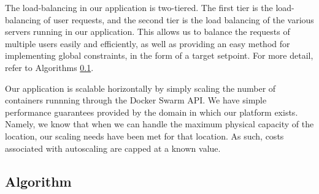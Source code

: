 \documentclass[10pt,twocolumn,letterpaper]{article}
\begin{document}
The load-balancing in our application is two-tiered. The first tier is the
load-balancing of user requests, and the second tier is the load balancing of
the various servers running in our application. This allows us to balance the
requests of multiple users easily and efficiently, as well as providing an easy
method for implementing global constraints, in the form of a target setpoint.
For more detail, refer to Algorithms \ref{subsection:alg}.

Our application is scalable horizontally by simply scaling the number of
containers runnning through the Docker Swarm API. We have simple performance
guarantees provided by the domain in which our platform exists. Namely, we know
that when we can handle the maximum physical capacity of the location, our
scaling needs have been met for that location. As such, costs associated with
autoscaling are capped at a known value.

\subsection{Algorithm}
\label{subsection:alg}
\end{document}
